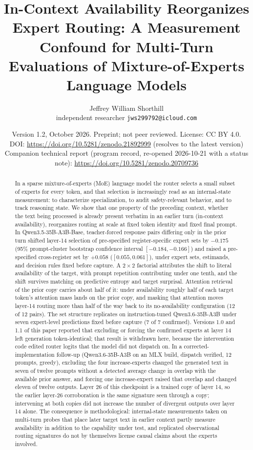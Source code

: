 \documentclass[10pt,a4paper,twocolumn]{article}
\title{\textbf{In-Context Availability Reorganizes Expert Routing: A Measurement Confound for Multi-Turn Evaluations of Mixture-of-Experts Language Models}}
\author{Jeffrey William Shorthill\\
\small independent researcher \quad \texttt{jws299792@icloud.com}}
\date{\small Version 1.2, October 2026. Preprint; not peer reviewed. License: CC BY 4.0.\\
\small DOI: \url{https://doi.org/10.5281/zenodo.21892999} (resolves to the latest version)\\
\small Companion technical report (program record, re-opened 2026-10-21 with a status note): \url{https://doi.org/10.5281/zenodo.20709736}}
\begin{document}
\maketitle

\begin{abstract}
In a sparse mixture-of-experts (MoE) language model the router selects a
small subset of experts for every token, and that selection is increasingly
read as an internal-state measurement: to characterize specialization, to
audit safety-relevant behavior, and to track reasoning state. We show that
one property of the preceding context, whether the text being processed is
already present verbatim in an earlier turn (in-context availability),
reorganizes routing at scale at fixed token identity and fixed final
prompt. In Qwen3.5-35B-A3B-Base, teacher-forced
response pairs differing only in the prior turn shifted layer-14 selection of
pre-specified register-specific expert sets by \(-0.175\) (95\% prompt-cluster
bootstrap confidence interval \([-0.184,-0.166]\)) and raised a pre-specified
cross-register set by \(+0.058\) (\([0.055,0.061]\)), under expert sets,
estimands, and decision rules fixed before capture. A \(2\times2\) factorial
attributes the shift to literal availability of the target, with prompt
repetition contributing under one tenth, and the shift survives matching on predictive entropy and target surprisal. Attention
retrieval of the prior copy carries about half of it: under availability
roughly half of each target token's attention mass lands on the prior copy,
and masking that attention moves layer-14 routing more than half of the way
back to its no-availability configuration (12 of 12 pairs). The set structure
replicates on instruction-tuned Qwen3.6-35B-A3B under seven expert-level
predictions fixed before capture (7 of 7 confirmed). Versions 1.0 and 1.1 of
this paper reported that excluding or forcing the confirmed experts at layer
14 left generation token-identical; that result is withdrawn here, because
the intervention code edited router logits that the model did not dispatch
on. In a corrected-implementation follow-up (Qwen3.6-35B-A3B on an MLX
build, dispatch verified, 12 prompts, greedy), excluding the four
increase-experts changed the generated text in seven of twelve prompts
without a detected average change in overlap with the available prior
answer, and forcing one increase-expert raised that overlap and changed
eleven of twelve outputs. Layer 26 of this checkpoint is a trained copy of
layer 14, so the earlier layer-26 corroboration is the same signature seen
through a copy; intervening at both copies did not increase the number of
divergent outputs over layer 14 alone. The consequence is methodological: internal-state
measurements taken on multi-turn probes that place later target text in
earlier context partly measure availability in addition to the capability
under test, and replicated observational routing signatures do not by themselves
license causal claims about the experts involved.
\end{abstract}
\end{document}
